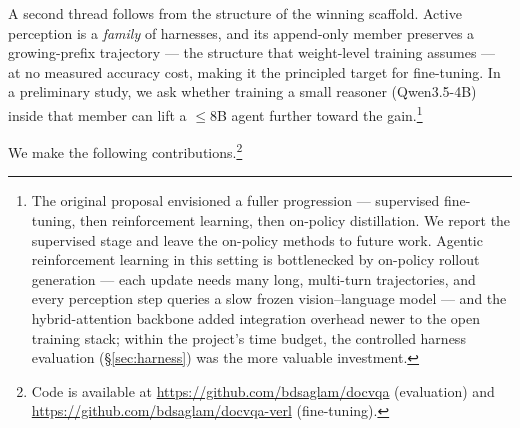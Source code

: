 A second thread follows from the structure of the winning scaffold. Active perception is a \emph{family} of harnesses, and its append-only member preserves a growing-prefix trajectory --- the structure that weight-level training assumes --- at no measured accuracy cost, making it the principled target for fine-tuning. In a preliminary study, we ask whether training a small reasoner (Qwen3.5-4B) inside that member can lift a $\leq$8B agent further toward the gain.\footnote{The original proposal envisioned a fuller progression --- supervised fine-tuning, then reinforcement learning, then on-policy distillation. We report the supervised stage and leave the on-policy methods to future work. Agentic reinforcement learning in this setting is bottlenecked by on-policy rollout generation --- each update needs many long, multi-turn trajectories, and every perception step queries a slow frozen vision--language model --- and the hybrid-attention backbone added integration overhead newer to the open training stack; within the project's time budget, the controlled harness evaluation (\S\ref{sec:harness}) was the more valuable investment.}

We make the following contributions.\footnote{Code is available at \url{https://github.com/bdsaglam/docvqa} (evaluation) and \url{https://github.com/bdsaglam/docvqa-verl} (fine-tuning).}

